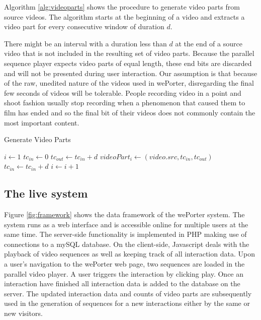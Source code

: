 Algorithm \ref{alg:videoparts} shows the procedure to generate video parts from source videos. The algorithm starts at the beginning of a video and extracts a video part for every consecutive window of duration $d$. 

There might be an interval with a duration less than $d$ at the end of a source video that is not included in the resulting set of video parts. Because the parallel sequence player expects video parts of equal length, these end bits are discarded and will not be presented during user interaction. Our assumption is that because of the raw, unedited nature of the videos used in wePorter, disregarding the final few seconds of videos will be tolerable. People recording video in a point and shoot fashion usually stop recording when a phenomenon that caused them to film has ended and so the final bit of their videos does not commonly contain the most important content.

\begin{algorithm}
  \caption{Generate Video Parts}
  \begin{algorithmic}[1]
      \State $i\gets 1$
        \State $tc_{in} \gets 0$
          \State $tc_{out} \gets tc_{in}+d$
          \State $videoPart_i \gets (video.src, tc_{in}, tc_{out})$ 
          \State $tc_{in} \gets tc_{in}+d$
          \State $i \gets i+1$
        \EndWhile
      \EndFor
    \EndProcedure
  \end{algorithmic}
  \label{alg:videoparts}
\end{algorithm}

\subsection{The live system}

Figure \ref{fig:framework} shows the data framework of the wePorter system. The system runs as a web interface and is accessible online for multiple users at the same time. The server-side functionality is implemented in PHP making use of connections to a mySQL database. On the client-side, Javascript deals with the playback of video sequences as well as keeping track of all interaction data. Upon a user's navigation to the wePorter web page, two sequences are loaded in the parallel video player. A user triggers the interaction by clicking play. Once an interaction have finished all interaction data is added to the database on the server. The updated interaction data and counts of video parts are subsequently used in the generation of sequences for a new interactions either by the same or new visitors.

